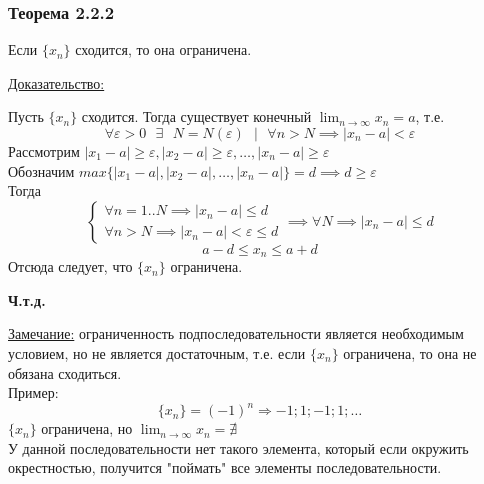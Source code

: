 \documentclass[12pt]{article}
\def\posl#1#2{\{#1_{#2}\}}
\begin{document}
    \subsubsection*{Теорема 2.2.2}\label{th:2.2.2}
    Если $\posl{x}{n}$ сходится, то она ограничена.\par\noindent
    \underline{Доказательство:}
    \begin{adjustwidth}{1.5em}{1.5em}
        Пусть $\posl{x}{n}$ сходится. Тогда существует конечный $\lim_{n\to\infty}x_n = a$, т.е.
        \[
            \forall \varepsilon > 0 \text{ } \exists \text{ } N = N(\varepsilon) \text{ } \big| \text{ } \forall n > N \implies |x_n - a| < \varepsilon
        \]
        Рассмотрим $|x_{1} - a| \ge \varepsilon, |x_{2} - a| \ge \varepsilon, \dots, |x_n - a| \ge \varepsilon$\\
        Обозначим $max\{|x_{1} - a|, |x_{2} - a|, \dots, |x_n - a|\} = d \implies d \ge \varepsilon$\\
        Тогда
        \[
            \begin{cases}
                \forall n = 1..N \implies |x_n - a| \le d\\
                \forall n > N \implies |x_n - a| < \varepsilon \le d
            \end{cases}
            \implies
            \forall N \implies |x_n - a| \le d
        \]
        \[
            a - d \le x_n \le a + d
        \]
        Отсюда следует, что $\posl{x}{n}$ ограничена.\\
        \begin{center}
            \textbf{Ч.т.д.}
        \end{center}
    \end{adjustwidth}
    
    \noindent \underline{Замечание:} ограниченность подпоследовательности является необходимым условием, но не является достаточным, т.е. если $\posl{x}{n}$ ограничена, то она не обязана сходиться.\\
    Пример:
    \[
        \posl{x}{n} = (-1)^n \Rightarrow -1; 1; -1; 1; \dots
    \]
    $\posl{x}{n}$ ограничена, но $\lim_{n\to\infty}x_n = \nexists$\\
    У данной последовательности нет такого элемента, который если окружить окрестностью, получится "поймать" все элементы последовательности.
    
\end{document}
